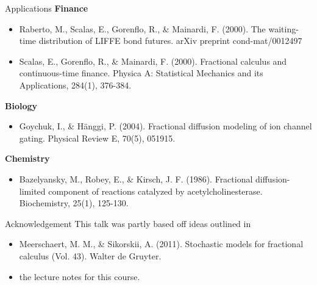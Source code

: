 \documentclass[pdf]{beamer}
\begin{document}
\begin{frame}{Applications}
    \textbf{Finance}
    \begin{itemize}
        \item Raberto, M., Scalas, E., Gorenflo, R., \& Mainardi, F. (2000). The waiting-time distribution of LIFFE bond futures. arXiv preprint cond-mat/0012497
        \item Scalas, E., Gorenflo, R., \& Mainardi, F. (2000). Fractional calculus and continuous-time finance. Physica A: Statistical Mechanics and its Applications, 284(1), 376-384.
    \end{itemize}
    \textbf{Biology}
    \begin{itemize}
        \item Goychuk, I., \& Hänggi, P. (2004). Fractional diffusion modeling of ion channel gating. Physical Review E, 70(5), 051915.
    \end{itemize}
    \textbf{Chemistry}
    \begin{itemize}
        \item Bazelyansky, M., Robey, E., \& Kirsch, J. F. (1986). Fractional diffusion-limited component of reactions catalyzed by acetylcholinesterase. Biochemistry, 25(1), 125-130.
    \end{itemize}
\end{frame}

\begin{frame}{Acknowledgement}
    This talk was partly based off ideas outlined in
    \begin{itemize}
    \item Meerschaert, M. M., \& Sikorskii, A. (2011). Stochastic models for fractional calculus (Vol. 43). Walter de Gruyter.
    \item the lecture notes for this course.
    \end{itemize}
\end{frame}
\end{document}
